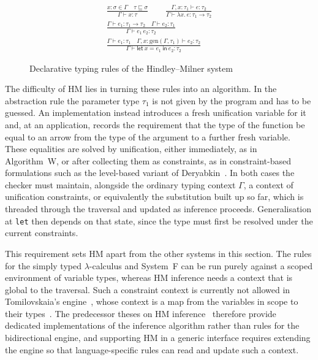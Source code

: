 \begin{figure}[ht]
\centering
{\Large
\[
\begin{gathered}
\frac{x : \sigma \in \Gamma \quad \tau \sqsubseteq \sigma}{\Gamma \vdash x : \tau}
\qquad
\frac{\Gamma, x : \tau_1 \vdash e : \tau_2}{\Gamma \vdash \lambda x.\, e : \tau_1 \to \tau_2}
\\[1.8ex]
\frac{\Gamma \vdash e_1 : \tau_1 \to \tau_2 \quad \Gamma \vdash e_2 : \tau_1}{\Gamma \vdash e_1\, e_2 : \tau_2}
\\[1.8ex]
\frac{\Gamma \vdash e_1 : \tau_1 \quad \Gamma, x : \mathrm{gen}(\Gamma, \tau_1) \vdash e_2 : \tau_2}{\Gamma \vdash \mathsf{let}\ x = e_1\ \mathsf{in}\ e_2 : \tau_2}
\end{gathered}
\]
}
\caption{Declarative typing rules of the Hindley--Milner system}
\label{fig:lr-hm}
\end{figure}

The difficulty of HM lies in turning these rules into an algorithm. In the abstraction rule the parameter type $\tau_1$ is not given by the program and has to be guessed. An implementation instead introduces a fresh unification variable for it and, at an application, records the requirement that the type of the function be equal to an arrow from the type of the argument to a further fresh variable. These equalities are solved by unification, either immediately, as in Algorithm~W, or after collecting them as constraints, as in constraint-based formulations such as the level-based variant of Deryabkin~\cite{deryabkin2025hmlevels}. In both cases the checker must maintain, alongside the ordinary typing context $\Gamma$, a context of unification constraints, or equivalently the substitution built up so far, which is threaded through the traversal and updated as inference proceeds. Generalisation at \texttt{let} then depends on that state, since the type must first be resolved under the current constraints.

This requirement sets HM apart from the other systems in this section. The rules for the simply typed $\lambda$-calculus and System~F can be run purely against a scoped environment of variable types, whereas HM inference needs a context that is global to the traversal. Such a constraint context is currently not allowed in Tomilovskaia's engine~\cite{tomilovskaia2025bidir}, whose context is a map from the variables in scope to their types~\cite[Sec.~3.3.1]{tomilovskaia2025bidir}. The predecessor theses on HM inference~\cite{smirnova2025thesis,deryabkin2025hmlevels} therefore provide dedicated implementations of the inference algorithm rather than rules for the bidirectional engine, and supporting HM in a generic interface requires extending the engine so that language-specific rules can read and update such a context.

